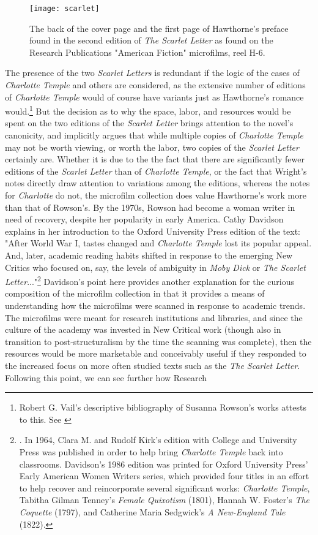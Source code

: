 \begin{figure}
\texttt{[image: scarlet]}
\caption{The back of the cover page and the first page of Hawthorne's preface found in the second edition of \textit{The Scarlet Letter} as found on the Research Publications "American Fiction" microfilms, reel H-6.}
\end{figure}

The presence of the two \textit{Scarlet Letters} is redundant if the logic of the cases of \textit{Charlotte Temple} and others are considered, as the extensive number of editions of \textit{Charlotte Temple} would of course have variants just as Hawthorne's romance would.\footnote{Robert G. Vail's descriptive bibliography of Susanna Rowson's works attests to this. See \autocite{vail_susanna_1933}} But the decision as to why the space, labor, and resources would be spent on the two editions of the \textit{Scarlet Letter} brings attention to the novel's canonicity, and implicitly argues that while multiple copies of \textit{Charlotte Temple} may not be worth viewing, or worth the labor, two copies of the \textit{Scarlet Letter} certainly are. Whether it is due to the the fact that there are significantly fewer editions of the \textit{Scarlet Letter} than of \textit{Charlotte Temple}, or the fact that Wright's notes directly draw attention to variations among the editions, whereas the notes for \textit{Charlotte} do not, the microfilm collection does value Hawthorne's work more than that of Rowson's. By the 1970s, Rowson had become a woman writer in need of recovery, despite her popularity in early America. Cathy Davidson explains in her introduction to the Oxford University Press edition of the text: "After World War I, tastes changed and \textit{Charlotte Temple} lost its popular appeal. And, later, academic reading habits shifted in response to the emerging New Critics who focused on, say, the levels of ambiguity in \textit{Moby Dick} or \textit{The Scarlet Letter}..."\footnote{\autocite[xxxii]{rowson_charlotte_1986}. In 1964, Clara M. and Rudolf Kirk's edition with College and University Press was published in order to help bring \textit{Charlotte Temple} back into classrooms. Davidson's 1986 edition was printed for Oxford University Press' Early American Women Writers series, which provided four titles in an effort to help recover and reincorporate several significant works: \textit{Charlotte Temple}, Tabitha Gilman Tenney's \textit{Female Quixotism} (1801), Hannah W. Foster's \textit{The Coquette} (1797), and Catherine Maria Sedgwick's \textit{A New-England Tale} (1822).} Davidson's point here provides another explanation for the curious composition of the microfilm collection in that it provides a means of understanding how the microfilms were scanned in response to academic trends. The microfilms were meant for research institutions and libraries, and since the culture of the academy was invested in New Critical work (though also in transition to post-structuralism by the time the scanning was complete), then the resources would be more marketable and conceivably useful if they responded to the increased focus on more often studied texts such as the \textit{The Scarlet Letter}. Following this point, we can see further how Research 